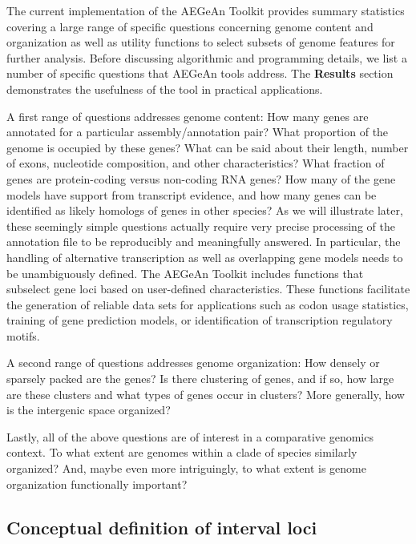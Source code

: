 The current implementation of the AEGeAn Toolkit provides summary statistics covering a large range of specific questions concerning genome content and organization as well as utility functions to select subsets of genome features for further analysis.
Before discussing algorithmic and programming details, we list a number of specific questions that AEGeAn tools address.
The \textbf{Results} section demonstrates the usefulness of the tool in practical applications.

A first range of questions addresses genome content:
How many genes are annotated for a particular assembly/annotation pair?
What proportion of the genome is occupied by these genes?
What can be said about their length, number of exons, nucleotide composition, and other characteristics?
What fraction of genes are protein-coding versus non-coding RNA genes?
How many of the gene models have support from transcript evidence, and how many genes can be identified as likely homologs of genes in other species?
As we will illustrate later, these seemingly simple questions actually require very precise processing of the annotation file to be reproducibly and meaningfully answered.
In particular, the handling of alternative transcription as well as overlapping gene models needs to be unambiguously defined.
The AEGeAn Toolkit includes functions that subselect gene loci based on user-defined characteristics.
These functions facilitate the generation of reliable data sets for applications such as codon usage statistics, training of gene prediction models, or identification of transcription regulatory motifs.

A second range of questions addresses genome organization:
How densely or sparsely packed are the genes?
Is there clustering of genes, and if so, how large are these clusters and what types of genes occur in clusters?
More generally, how is the intergenic space organized?

Lastly, all of the above questions are of interest in a comparative genomics context.
To what extent are genomes within a clade of species similarly organized?
And, maybe even more intriguingly, to what extent is genome organization functionally important?%

\subsection*{Conceptual definition of interval loci}

